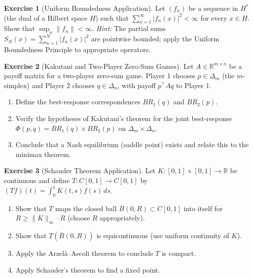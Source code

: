 \documentclass[11pt,a4paper]{article}
\theoremstyle{definition}
\newtheorem{exercise}{Exercise}[section]
\theoremstyle{plain}
\theoremstyle{remark}
\newcommand{\R}{\mathbb{R}}
\begin{document}
\begin{exercise}[Uniform Boundedness Application]\label{ex:ubp-app}
Let $(f_n)$ be a sequence in $H^*$ (the dual of a Hilbert space $H$) such
that $\sum_{n=1}^\infty |f_n(x)|^2 < \infty$ for every $x \in H$. Show that
$\sup_n \|f_n\| < \infty$.
\emph{Hint:} The partial sums $S_N(x) = \sum_{n=1}^N |f_n(x)|^2$ are
pointwise bounded; apply the Uniform Boundedness Principle to appropriate
operators.
\end{exercise}

\begin{exercise}[Kakutani and Two-Player Zero-Sum Games]\label{ex:kakutani-zerosum}
Let $A \in \R^{m \times n}$ be a payoff matrix for a two-player zero-sum game.
Player 1 chooses $p \in \Delta_m$ (the $m$-simplex) and Player 2 chooses
$q \in \Delta_n$, with payoff $p^\top A q$ to Player 1.
\begin{enumerate}[label=(\alph*)]
    \item Define the best-response correspondences $BR_1(q)$ and $BR_2(p)$.
    \item Verify the hypotheses of Kakutani's theorem for the joint
          best-response $\Phi(p,q) = BR_1(q) \times BR_2(p)$ on
          $\Delta_m \times \Delta_n$.
    \item Conclude that a Nash equilibrium (saddle point) exists and relate
          this to the minimax theorem.
\end{enumerate}
\end{exercise}

\begin{exercise}[Schauder Theorem Application]\label{ex:schauder-app}
Let $K \colon [0,1] \times [0,1] \to \R$ be continuous and define
$T \colon C[0,1] \to C[0,1]$ by $(Tf)(t) = \int_0^1 K(t,s) f(s)\, ds$.
\begin{enumerate}[label=(\alph*)]
    \item Show that $T$ maps the closed ball
          $\overline{B}(0, R) \subset C[0,1]$ into itself for
          $R \geq \|K\|_\infty \cdot R$ (choose $R$ appropriately).
    \item Show that $T(\overline{B}(0, R))$ is equicontinuous (use uniform
          continuity of $K$).
    \item Apply the Arzel\`{a}--Ascoli theorem to conclude $T$ is compact.
    \item Apply Schauder's theorem to find a fixed point.
\end{enumerate}
\end{exercise}
\end{document}
